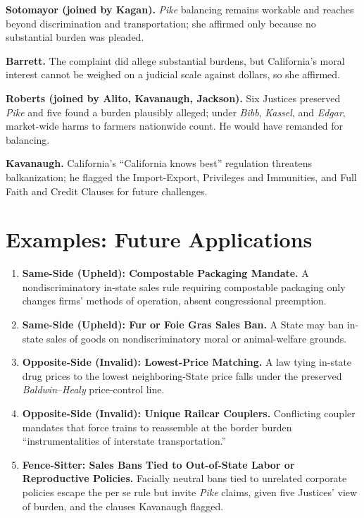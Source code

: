 \documentclass[12pt]{article}
\begin{document}
\textbf{Sotomayor (joined by Kagan).} \textit{Pike} balancing remains workable and reaches beyond discrimination and transportation; she affirmed only because no substantial burden was pleaded.

\textbf{Barrett.} The complaint did allege substantial burdens, but California's moral interest cannot be weighed on a judicial scale against dollars, so she affirmed.

\textbf{Roberts (joined by Alito, Kavanaugh, Jackson).} Six Justices preserved \textit{Pike} and five found a burden plausibly alleged; under \textit{Bibb}, \textit{Kassel}, and \textit{Edgar}, market-wide harms to farmers nationwide count. He would have remanded for balancing.

\textbf{Kavanaugh.} California's ``California knows best'' regulation threatens balkanization; he flagged the Import-Export, Privileges and Immunities, and Full Faith and Credit Clauses for future challenges.

\section{Examples: Future Applications}

\begin{enumerate}
\item \textbf{Same-Side (Upheld): Compostable Packaging Mandate.} A nondiscriminatory in-state sales rule requiring compostable packaging only changes firms' methods of operation, absent congressional preemption.
\item \textbf{Same-Side (Upheld): Fur or Foie Gras Sales Ban.} A State may ban in-state sales of goods on nondiscriminatory moral or animal-welfare grounds.
\item \textbf{Opposite-Side (Invalid): Lowest-Price Matching.} A law tying in-state drug prices to the lowest neighboring-State price falls under the preserved \textit{Baldwin}--\textit{Healy} price-control line.
\item \textbf{Opposite-Side (Invalid): Unique Railcar Couplers.} Conflicting coupler mandates that force trains to reassemble at the border burden ``instrumentalities of interstate transportation.''
\item \textbf{Fence-Sitter: Sales Bans Tied to Out-of-State Labor or Reproductive Policies.} Facially neutral bans tied to unrelated corporate policies escape the per se rule but invite \textit{Pike} claims, given five Justices' view of burden, and the clauses Kavanaugh flagged.
\end{enumerate}
\end{document}
